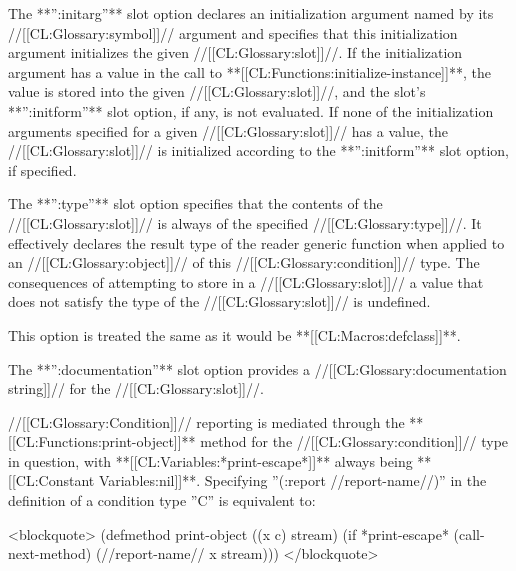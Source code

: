 
The **'':initarg''** slot option declares an initialization argument named by its //[[CL:Glossary:symbol]]// argument and specifies that this initialization argument initializes the given //[[CL:Glossary:slot]]//. If the initialization argument has a value in the call to **[[CL:Functions:initialize-instance]]**, the value is stored into the given //[[CL:Glossary:slot]]//, and the slot's **'':initform''** slot option, if any, is not evaluated. If none of the initialization arguments specified for a given //[[CL:Glossary:slot]]// has a value, the //[[CL:Glossary:slot]]// is initialized according to the **'':initform''** slot option, if specified.


The **'':type''** slot option specifies that the contents of the //[[CL:Glossary:slot]]// is always of the specified //[[CL:Glossary:type]]//. It effectively declares the result type of the reader generic function when applied to an //[[CL:Glossary:object]]// of this //[[CL:Glossary:condition]]// type. The consequences of attempting to store in a //[[CL:Glossary:slot]]// a value that does not satisfy the type of the //[[CL:Glossary:slot]]// is undefined.




This option is treated the same as it would be **[[CL:Macros:defclass]]**.



The **'':documentation''** slot option provides a //[[CL:Glossary:documentation string]]// for the //[[CL:Glossary:slot]]//.



//[[CL:Glossary:Condition]]// reporting is mediated through the **[[CL:Functions:print-object]]** method for the //[[CL:Glossary:condition]]// type in question, with **[[CL:Variables:*print-escape*]]** always being **[[CL:Constant Variables:nil]]**. Specifying ''(:report //report-name//)'' in the definition of a condition type ''C'' is equivalent to:

<blockquote> (defmethod print-object ((x c) stream) (if *print-escape* (call-next-method) (//report-name// x stream))) </blockquote>

